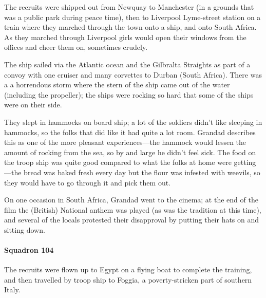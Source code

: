 The recruits were shipped out from Newquay to Manchester (in a grounds that was a public park during peace
time), then to Liverpool Lyme-street station on a train where they marched through the town onto a ship,
and onto South Africa.  As they marched through Liverpool girls would open their windows from the offices and
cheer them on, sometimes crudely.

The ship sailed via the Atlantic ocean and the Gilbralta Straights as part of a convoy with one cruiser and many corvettes to Durban (South Africa).
There was a a horrendous storm where the stern of the ship came out of the water (including the propeller);
the ships were rocking so hard that some of the ships were on their side.

They slept in hammocks on board ship; a lot of the soldiers
didn't like sleeping in hammocks, so the folks that did like it had quite a lot room. Grandad describes this as
one of the more pleasant experiences---the hammock would lessen the amount of rocking from the
sea, so by and large he didn't feel sick. The food on the troop ship was quite good compared
to what the folks at home were getting---the bread was baked fresh every day but the flour was
infested with weevils, so they would have to go through it and pick them out.

\begin{figure}
	\centering
\end{figure}
On one occasion in South Africa, Grandad went to the cinema; at the end of the film
the (British) National anthem was played (as was the tradition at this time), and several of the
locals protested their disapproval by putting their hats on and sitting down.

\paragraph{Squadron 104} The recruits were flown up to Egypt on a flying boat to complete the training, and
then travelled by troop ship to Foggia, a poverty-stricken part of southern Italy.

